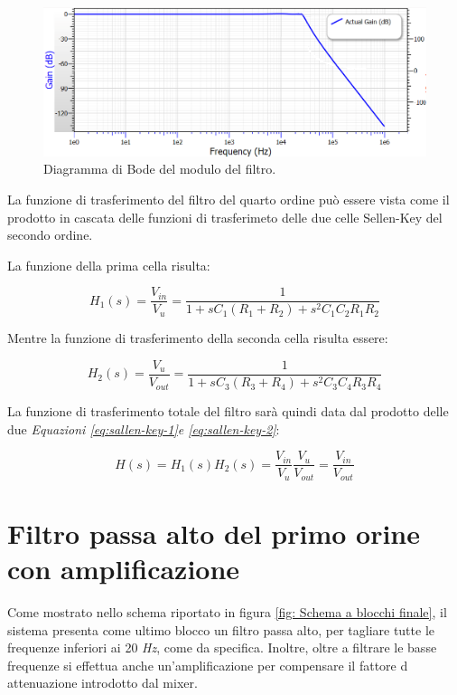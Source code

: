 \documentclass[titlepage]{report}
\begin{document}
	\begin{figure}[H]
		\centering
		\includegraphics[scale=0.9]{Immagini/bode_teorico_lp4.png}
		\caption{Diagramma di Bode del modulo del filtro.}
		\label{fig:BodeLp4}
	\end{figure}

	La funzione di trasferimento del filtro del quarto ordine può essere vista come il prodotto in cascata delle funzioni di trasferimeto delle due celle Sellen-Key del secondo ordine.

	La funzione della prima cella risulta:

	\begin{equation}
		\label{eq:sallen-key-1}
		H_1(s) = \frac{V_{in}}{V_u}  =  \frac{1}{1 + sC_1(R_1 + R_2)+ s^2C_1C_2R_1R_2 } 
	\end{equation}

	Mentre la funzione di trasferimento della seconda cella risulta essere:

	\begin{equation}
		\label{eq:sallen-key-2}
		H_2(s) = \frac{V_u}{V_{out}}  = \frac{1}{1 + sC_3(R_3 + R_4)+ s^2C_3C_4R_3R_4 } 
	\end{equation}

	La funzione di trasferimento totale del filtro sarà quindi data dal prodotto delle due \textit{Equazioni \ref{eq:sallen-key-1}e \ref{eq:sallen-key-2}}:

	\begin{equation}
		H(s) = H_1(s)H_2(s) =  \frac{V_{in}}{V_u}\frac{V_u}{V_{out}} = \frac{V_{in}}{V_{out}}
	\end{equation}

	\section{Filtro passa alto del primo orine con amplificazione}
	Come mostrato nello schema riportato in figura \ref{fig: Schema a blocchi finale}, il sistema presenta come ultimo blocco un filtro passa alto, per tagliare tutte le frequenze inferiori ai 20 \textit{Hz}, come da specifica. Inoltre, oltre a filtrare le basse frequenze si effettua anche un'amplificazione per compensare il fattore d attenuazione introdotto dal mixer.
\end{document}
